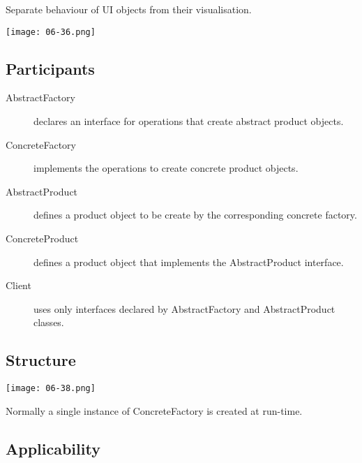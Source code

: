 Separate behaviour of UI objects from their visualisation.

\begin{center}
\texttt{[image: 06-36.png]}
\end{center}



\subsection{Participants}

\begin{description}
\item[AbstractFactory]
	
	declares an interface for operations that create abstract product objects.

\item[ConcreteFactory]

	implements the operations to create concrete product objects.

\item[AbstractProduct]

	defines a product object to be create by the corresponding concrete factory.

\item[ConcreteProduct]

	defines a product object that implements the AbstractProduct interface.

\item[Client]
	
	uses only interfaces declared by AbstractFactory and AbstractProduct classes.
\end{description}



\subsection{Structure}

\begin{center}
\texttt{[image: 06-38.png]}
\end{center}

Normally a single instance of ConcreteFactory is created at run-time.



\subsection{Applicability}

